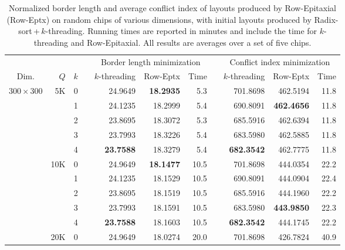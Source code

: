 \begin{table}[p!]\centering
\caption{\label{tab:reptx}
  Normalized border length and average conflict index of layouts produced by
  Row-Epitaxial (Row-Eptx) on random chips of various dimensions, with initial
  layouts produced by Radix-sort\,+\,$k$-threading. Running times are reported
  in minutes and include the time for $k$-threading and Row-Epitaxial. All
  results are averages over a set of five chips.}
\footnotesize{
\begin{tabular*}{\hsize}{crrlrrrlrrr}
\vspace{1pt}
     &     &     & & \multicolumn{3}{c}{Border length minimization} & & \multicolumn{3}{c}{Conflict index minimization} \\ \cline{5-7} \cline{9-11}
\vspace{1pt}
Dim. & $Q$ & $k$ & & $k$-threading & Row-Eptx & Time                & & $k$-threading & Row-Eptx & Time \\
\hline
$300\times 300$ &  5K & 0 &  &      24.9649  & {\bf 18.2935} &   5.3 &  &      701.8698  &      462.5194  &  11.8 \\
                &     & 1 &  &      24.1235  &      18.2999  &   5.4 &  &      690.8091  & {\bf 462.4656} &  11.8 \\
                &     & 2 &  &      23.8695  &      18.3072  &   5.3 &  &      685.5916  &      462.6394  &  11.8 \\
                &     & 3 &  &      23.7993  &      18.3226  &   5.4 &  &      683.5980  &      462.5885  &  11.8 \\
                &     & 4 &  & {\bf 23.7588} &      18.3279  &   5.4 &  & {\bf 682.3542} &      462.7775  &  11.8 \\
\cline{2-11}
                & 10K & 0 &  &      24.9649  & {\bf 18.1477} &  10.5 &  &      701.8698  &      444.0354  &  22.2 \\
                &     & 1 &  &      24.1235  &      18.1529  &  10.5 &  &      690.8091  &      444.0904  &  22.4 \\
                &     & 2 &  &      23.8695  &      18.1519  &  10.5 &  &      685.5916  &      444.1960  &  22.2 \\
                &     & 3 &  &      23.7993  &      18.1591  &  10.5 &  &      683.5980  & {\bf 443.9850} &  22.3 \\
                &     & 4 &  & {\bf 23.7588} &      18.1603  &  10.5 &  & {\bf 682.3542} &      444.1745  &  22.2 \\
\cline{2-11}
                & 20K & 0 &  &      24.9649  &      18.0274  &  20.0 &  &      701.8698  &      426.7824  &  40.9 \\

\end{tabular*}}
\end{table}
